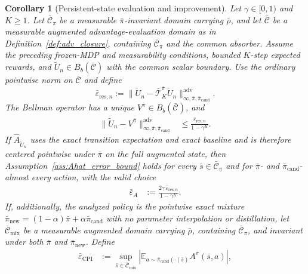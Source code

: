 \documentclass{article}
\theoremstyle{plain}
\newtheorem{corollary}[theorem]{Corollary}
\theoremstyle{definition}
\theoremstyle{remark}
\newcommand{\E}{\mathbb{E}}
\begin{document}
\begin{corollary}[Persistent-state evaluation and improvement]
\label{cor:persistent_cpi_augmented}
Let $\gamma\in[0,1)$ and $K\ge1$. Let $\bar{\mathcal C}_\pi$ be a
measurable $\bar\pi$-invariant domain carrying $\bar\rho$, and let
$\bar{\mathcal C}$ be a measurable augmented advantage-evaluation domain
as in Definition~\ref{def:adv_closure}, containing
$\bar{\mathcal C}_\pi$ and the common absorber. Assume the preceding
frozen-MDP and measurability conditions, bounded $K$-step expected rewards,
and $\widetilde U_n\in B_b(\bar{\mathcal C})$ with the common scalar boundary.
Use the ordinary pointwise norm on $\bar{\mathcal C}$ and define
\begin{equation}
\bar\varepsilon_{\mathrm{res},n}
:=
\|\widetilde U_n-\bar{\mathcal T}^{\bar\pi}_K\widetilde U_n\|_{\infty,\bar\pi,\bar\pi_{\mathrm{cand}}}^{\mathrm{adv}}.
\label{eq:persistent_direct_residual}
\end{equation}
The Bellman operator has a unique
$V^{\bar\pi}\in B_b(\bar{\mathcal C})$, and
\begin{align}
\|\widetilde U_n-V^{\bar\pi}\|_{\infty,\bar\pi,\bar\pi_{\mathrm{cand}}}^{\mathrm{adv}}
&\le \frac{\bar\varepsilon_{\mathrm{res},n}}{1-\gamma^K}.
\label{eq:persistent_augmented_value}
\end{align}
If $\widehat A_{\widetilde U_n}$ uses the exact transition expectation and exact baseline and is therefore centered pointwise under $\bar\pi$ on the full augmented state, then Assumption~\ref{ass:Ahat_error_bound} holds for every $\bar s\in\bar{\mathcal C}_\pi$ and for $\bar\pi$- and $\bar\pi_{\mathrm{cand}}$-almost every action, with the valid choice
\begin{align}
\bar\varepsilon_A
&:=\frac{2\gamma\,\bar\varepsilon_{\mathrm{res},n}}{1-\gamma^K}.
\label{eq:persistent_augmented_adv}
\end{align}
If, additionally, the analyzed policy is the pointwise exact mixture
$\bar\pi_{\mathrm{new}}=(1-\alpha)\bar\pi+\alpha\bar\pi_{\mathrm{cand}}$
with no parameter interpolation or distillation, let
$\bar{\mathcal C}_{\mathrm{mix}}$ be a measurable augmented domain carrying
$\bar\rho$, containing $\bar{\mathcal C}_\pi$, and invariant under both $\bar\pi$ and
$\bar\pi_{\mathrm{new}}$. Define
\begin{align}
\bar\varepsilon_{\mathrm{CPI}}
&:=\sup_{\bar s\in\bar{\mathcal C}_{\mathrm{mix}}}
\left|\E_{a\sim\bar\pi_{\mathrm{cand}}(\cdot\mid\bar s)}
A^{\bar\pi}(\bar s,a)\right|,
\label{eq:persistent_cpi_constant}\\

\end{align}
\end{corollary}
\end{document}
